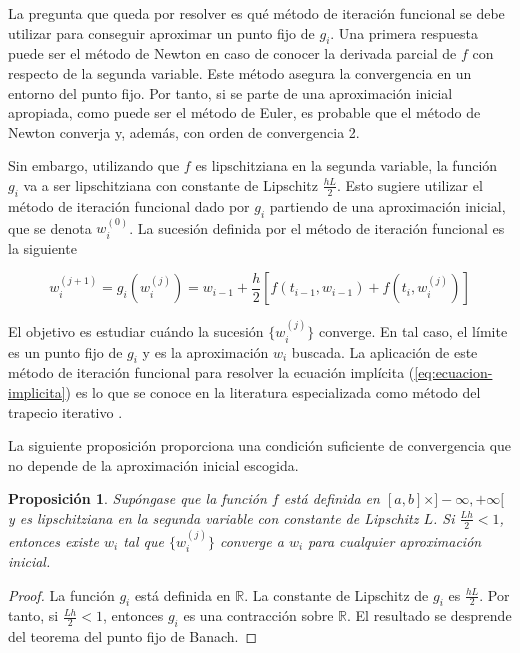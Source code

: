 \documentclass{article}
\theoremstyle{theorem-style}  %
\newtheorem{proposition}[theorem]{Proposición}
\theoremstyle{definition-style}
\theoremstyle{example-style}
\begin{document}
	La pregunta que queda por resolver es qué método de iteración funcional se debe utilizar para conseguir aproximar un punto fijo de $g_i$. Una primera respuesta puede ser el método de Newton en caso de conocer la derivada parcial de $f$ con respecto de la segunda variable. Este método asegura la convergencia en un entorno del punto fijo. Por tanto, si se parte de una aproximación inicial apropiada, como puede ser el método de Euler, es probable que el método de Newton converja y, además, con orden de convergencia 2.

	Sin embargo, utilizando que $f$ es lipschitziana en la segunda variable, la función $g_i$ va a ser lipschitziana con constante de Lipschitz $\frac{hL}{2}$. Esto sugiere utilizar el método de iteración funcional dado por $g_i$ partiendo de una aproximación inicial, que se denota $w_i^{(0)}$. La sucesión definida por el método de iteración funcional es la siguiente

	\begin{equation} \label{eq:ti-def}
		w_{i} ^{(j+1)} = g_i(w_i^{(j)}) = w_{i-1} + \frac{h}{2} \left[f(t_{i-1}, w_{i-1}) + f(t_i, w_{i}^{(j)})\right]
	\end{equation}

	El objetivo es estudiar cuándo la sucesión $\{w_{i}^{(j)}\}$ converge. En tal caso, el límite es un punto fijo de $g_i$ y es la aproximación $w_i$ buscada. La aplicación de este método de iteración funcional para resolver la ecuación implícita (\ref{eq:ecuacion-implicita}) es lo que se conoce en la literatura especializada como método del trapecio iterativo \cite{akitson}.

	La siguiente proposición proporciona una condición suficiente de convergencia que no depende de la aproximación inicial escogida.

	\begin{proposition}
		Supóngase que la función $f$ está definida en $[a,b]\times]-\infty, +\infty[$ y es lipschitziana en la segunda variable con constante de Lipschitz $L$. Si $\frac{Lh}{2} < 1$, entonces existe $w_i$ tal que $\{w_i^{(j)}\}$ converge a $w_i$ para cualquier aproximación inicial.
	\end{proposition}

	\begin{proof}
		La función $g_i$ está definida en $\mathbb{R}$. La constante de Lipschitz de $g_i$ es $\frac{hL}{2}$. Por tanto, si $\frac{Lh}{2} < 1$, entonces $g_i$ es una contracción sobre $\mathbb{R}$. El resultado se desprende del teorema del punto fijo de Banach.
	\end{proof}
\end{document}
